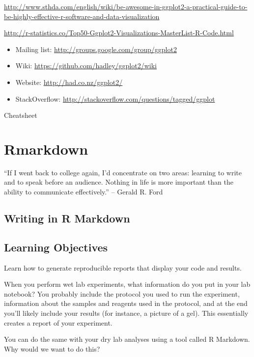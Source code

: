 \documentclass[
]{book}
\providecommand{\tightlist}{%
  \setlength{\itemsep}{0pt}\setlength{\parskip}{0pt}}
\begin{document}
\url{http://www.sthda.com/english/wiki/be-awesome-in-ggplot2-a-practical-guide-to-be-highly-effective-r-software-and-data-visualization}

\url{http://r-statistics.co/Top50-Ggplot2-Visualizations-MasterList-R-Code.html}

\begin{itemize}
\tightlist
\item
  Mailing list: \url{http://groups.google.com/group/ggplot2}
\item
  Wiki: \url{https://github.com/hadley/ggplot2/wiki}
\item
  Website: \url{http://had.co.nz/ggplot2/}
\item
  StackOverflow: \url{http://stackoverflow.com/questions/tagged/ggplot}
\end{itemize}

Cheatsheet

\hypertarget{rmarkdown}{%
\chapter{Rmarkdown}\label{rmarkdown}}

``If I went back to college again, I'd concentrate on two areas: learning to write and to speak before an audience. Nothing in life is more important than the ability to communicate effectively.''
-- Gerald R. Ford

\hypertarget{writing-in-r-markdown}{%
\section{Writing in R Markdown}\label{writing-in-r-markdown}}

\hypertarget{learning-objectives-3}{%
\section{Learning Objectives}\label{learning-objectives-3}}

Learn how to generate reproducible reports that display your code and results.

When you perform wet lab experiments, what information do you put in your lab notebook? You probably include the protocol you used to run the experiment, information about the samples and reagents used in the protocol, and at the end you'll likely include your results (for instance, a picture of a gel). This essentially creates a report of your experiment.

You can do the same with your dry lab analyses using a tool called R Markdown. Why would we want to do this?
\end{document}
